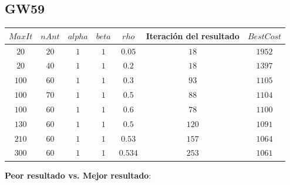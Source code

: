 \documentclass[12pt, a4paper]{article}
\begin{document}
\subsection{GW59} \label{subsec:gw59}

\begin{table}[!ht]
    \begin{adjustbox}{width=\textwidth}
        \begin{tabular}{|c|c|c|c|c|c|c|}
            \rowcolor{yellow}
            \hline
            $MaxIt$ & $nAnt$ & $alpha$ & $beta$ & $rho$   & Iteración del resultado & $BestCost$ \\
            \hline
            $20$    & $20$   & $1$     & $1$    & $0.05$  & $18$                    & $1952$     \\
            \hline
            $20$    & $40$   & $1$     & $1$    & $0.2$   & $18$                    & $1397$     \\
            \hline
            $100$   & $60$   & $1$     & $1$    & $0.3$   & $93$                    & $1105$     \\
            \hline
            $100$   & $70$   & $1$     & $1$    & $0.5$   & $88$                    & $1104$     \\
            \hline
            $100$   & $60$   & $1$     & $1$    & $0.6$   & $78$                    & $1100$     \\
            \hline
            $130$   & $60$   & $1$     & $1$    & $0.5$   & $120$                   & $1091$     \\
            \hline
            $210$   & $60$   & $1$     & $1$    & $0.53$  & $157$                   & $1064$     \\
            \hline
            $300$   & $60$   & $1$     & $1$    & $0.534$ & $253$                   & $1061$     \\
            \hline
        \end{tabular}
    \end{adjustbox}
\end{table}

\textbf{Peor resultado vs. Mejor resultado}:
\end{document}
